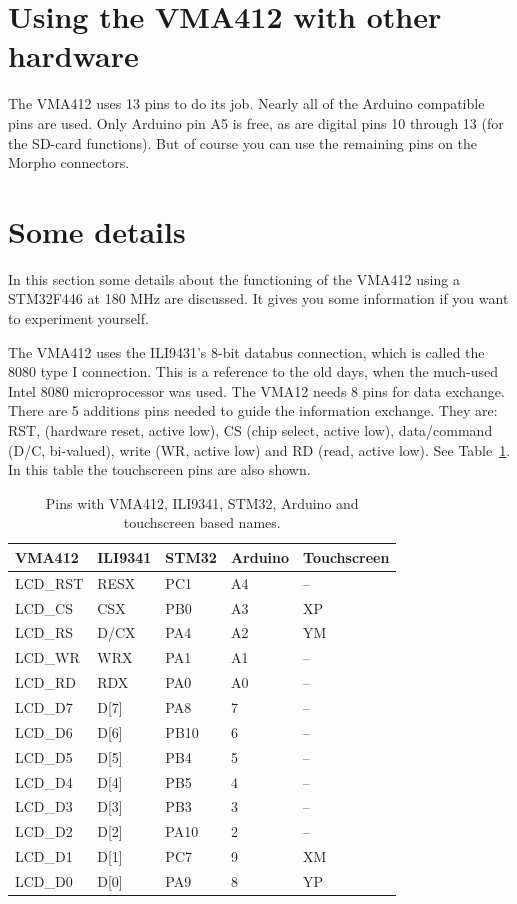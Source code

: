 \documentclass[12pt]{article}
\begin{document}
\section{Using the VMA412 with other hardware}
The VMA412 uses 13 pins to do its job. Nearly all of the Arduino compatible pins are used. Only Arduino pin A5 is free, as are digital pins 10 through 13 (for the SD-card functions). But of course you can use the remaining pins on the Morpho connectors.


\section{Some details}
In this section some details about the functioning of the VMA412 using a STM32F446 at 180 MHz are discussed. It gives you some information if you want to experiment yourself. 

The VMA412 uses the ILI9431's 8-bit databus connection, which is called the 8080 type I connection. This is a reference to the old days, when the much-used Intel 8080 microprocessor was used. The VMA12 needs 8 pins for data exchange. There are 5 additions pins needed to guide the information exchange. They are: RST, (hardware reset, active low), CS (chip select, active low), data/command (D/C, bi-valued), write (WR, active low) and RD (read, active low). See Table~\ref{tab:1}. In this table the touchscreen pins are also shown.

\begin{table}[!ht]
\centering
\caption{Pins with VMA412, ILI9341, STM32, Arduino and touchscreen based names.}
\label{tab:1}
\begin{tabular}{p{2.5cm}p{2.5cm}p{2.5cm}p{2.5cm}p{2.5cm}}
\toprule
VMA412 & ILI9341 & STM32 & Arduino & Touchscreen \\
\midrule
LCD\_RST & RESX & PC1    & A4 & -- \\
LCD\_CS  & CSX  & PB0    & A3 & XP \\
LCD\_RS  & D/CX & PA4    & A2 & YM \\
LCD\_WR  & WRX  & PA1    & A1 & -- \\
LCD\_RD  & RDX  & PA0    & A0 & -- \\[.8ex]
LCD\_D7  & D[7] & PA8    & 7  & -- \\
LCD\_D6  & D[6] & PB10   & 6  & -- \\
LCD\_D5  & D[5] & PB4    & 5  & -- \\
LCD\_D4  & D[4] & PB5    & 4  & -- \\
LCD\_D3  & D[3] & PB3    & 3  & -- \\
LCD\_D2  & D[2] & PA10   & 2  & -- \\
LCD\_D1  & D[1] & PC7    & 9  & XM \\
LCD\_D0  & D[0] & PA9    & 8  & YP \\
\bottomrule
\end{tabular}
\end{table}
\end{document}

